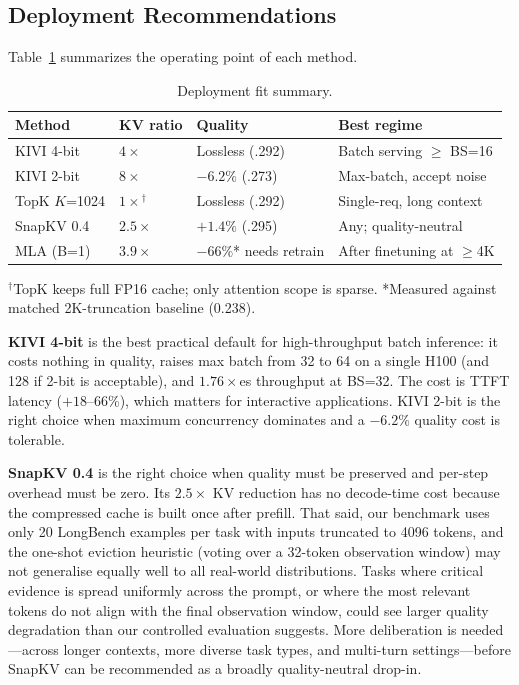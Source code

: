 \documentclass[conference]{IEEEtran}
\begin{document}
\subsection{Deployment Recommendations}

Table~\ref{tab:tradeoff} summarizes the operating point of each method.

\begin{table}[!t]
\centering
\caption{Deployment fit summary.}
\label{tab:tradeoff}
\setlength{\tabcolsep}{3pt}
\begin{tabular}{@{}llll@{}}
\toprule
\textbf{Method} & \textbf{KV ratio} & \textbf{Quality} & \textbf{Best regime} \\
\midrule
KIVI 4-bit  & $4\times$  & Lossless (.292)        & Batch serving $\geq$ BS=16 \\
KIVI 2-bit  & $8\times$  & $-6.2\%$ (.273)        & Max-batch, accept noise \\
TopK $K$=1024 & $1\times$$^{\dagger}$ & Lossless (.292) & Single-req, long context \\
SnapKV 0.4  & $2.5\times$ & $+1.4\%$ (.295)       & Any; quality-neutral \\
MLA (B=1)   & $3.9\times$ & $-66\%$* needs retrain & After finetuning at $\geq$4K \\
\bottomrule
\end{tabular}
\vspace{1pt}
\footnotesize{$^{\dagger}$TopK keeps full FP16 cache; only attention scope is sparse.  *Measured against matched 2K-truncation baseline (0.238).}
\end{table}

\textbf{KIVI 4-bit} is the best practical default for high-throughput
batch inference: it costs nothing in quality, raises max batch from 32
to 64 on a single H100 (and 128 if 2-bit is acceptable), and
$1.76\times$es throughput at BS=32.  The cost is TTFT latency
($+18$--$66\%$), which matters for interactive applications.  KIVI
2-bit is the right choice when maximum concurrency dominates and a
$-6.2\%$ quality cost is tolerable.

\textbf{SnapKV 0.4} is the right choice when quality must be preserved
and per-step overhead must be zero.  Its $2.5\times$ KV reduction has
no decode-time cost because the compressed cache is built once after
prefill.  That said, our benchmark uses only 20 LongBench examples per
task with inputs truncated to 4096 tokens, and the one-shot eviction
heuristic (voting over a 32-token observation window) may not generalise
equally well to all real-world distributions.  Tasks where critical
evidence is spread uniformly across the prompt, or where the most
relevant tokens do not align with the final observation window, could
see larger quality degradation than our controlled evaluation suggests.
More deliberation is needed---across longer contexts, more diverse task
types, and multi-turn settings---before SnapKV can be recommended as a
broadly quality-neutral drop-in.
\end{document}
